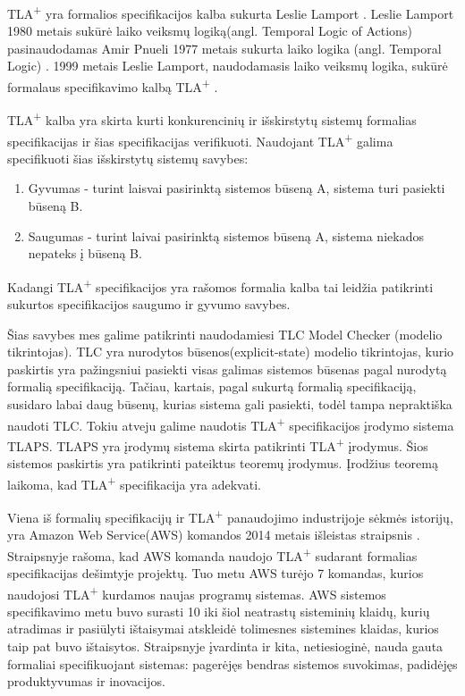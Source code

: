 \documentclass{VUMIFPSmagistrinis}
\begin{document}
		TLA\textsuperscript{+} yra formalios specifikacijos kalba sukurta Leslie Lamport \cite{lamport2002specifying}.
		Leslie Lamport 1980 metais sukūrė laiko veiksmų logiką(angl. Temporal Logic of Actions) \cite{10.1145/177492.177726} pasinaudodamas Amir Pnueli 1977 metais sukurta laiko logika (angl. Temporal Logic) \cite{4567924}.
		1999 metais Leslie Lamport, naudodamasis laiko veiksmų logika, sukūrė formalaus specifikavimo kalbą TLA\textsuperscript{+} \cite{lamport2002specifying}.
		

TLA\textsuperscript{+} kalba yra skirta kurti konkurencinių ir išskirstytų sistemų formalias specifikacijas ir šias specifikacijas verifikuoti.
		Naudojant TLA\textsuperscript{+} galima specifikuoti šias išskirstytų sistemų savybes:
		\begin{enumerate}
			\item{Gyvumas - turint laisvai pasirinktą sistemos būseną A, sistema turi pasiekti būseną B.}
			\item{Saugumas - turint laivai pasirinktą sistemos būseną A, sistema niekados nepateks į būseną B.}
		\end{enumerate}
		Kadangi TLA\textsuperscript{+} specifikacijos yra rašomos formalia kalba tai leidžia patikrinti sukurtos specifikacijos saugumo ir gyvumo savybes.
		

	Šias savybes mes galime patikrinti naudodamiesi TLC Model Checker (modelio tikrintojas).
		TLC yra nurodytos būsenos(explicit-state) modelio tikrintojas, kurio paskirtis yra pažingsniui pasiekti visas galimas sistemos būsenas pagal nurodytą formalią specifikaciją.
		Tačiau, kartais, pagal sukurtą formalią specifikaciją, susidaro labai daug būsenų, kurias sistema gali pasiekti, todėl tampa nepraktiška naudoti TLC.
		Tokiu atveju galime naudotis TLA\textsuperscript{+} specifikacijos įrodymo sistema TLAPS.
		TLAPS yra įrodymų sistema skirta patikrinti TLA\textsuperscript{+} įrodymus.
		Šios sistemos paskirtis yra patikrinti pateiktus teoremų įrodymus.
		Įrodžius teoremą laikoma, kad TLA\textsuperscript{+} specifikacija yra adekvati.


		Viena iš formalių specifikacijų ir TLA\textsuperscript{+} panaudojimo industrijoje sėkmės istorijų, yra Amazon Web Service(AWS) komandos 2014 metais išleistas straipsnis \cite{newcombe2014use}.
		Straipsnyje rašoma,  kad AWS komanda naudojo TLA\textsuperscript{+} sudarant formalias specifikacijas dešimtyje projektų. Tuo metu AWS turėjo 7 komandas, kurios naudojosi TLA\textsuperscript{+} kurdamos naujas programų sistemas.
		AWS sistemos specifikavimo metu buvo surasti 10 iki šiol neatrastų sisteminių klaidų, kurių atradimas ir pasiūlyti ištaisymai atskleidė tolimesnes sistemines klaidas, kurios taip pat buvo ištaisytos.
		Straipsnyje įvardinta ir kita, netiesioginė, nauda gauta formaliai specifikuojant sistemas: pagerėjęs bendras sistemos suvokimas, padidėjęs produktyvumas ir inovacijos.
		
\end{document}
